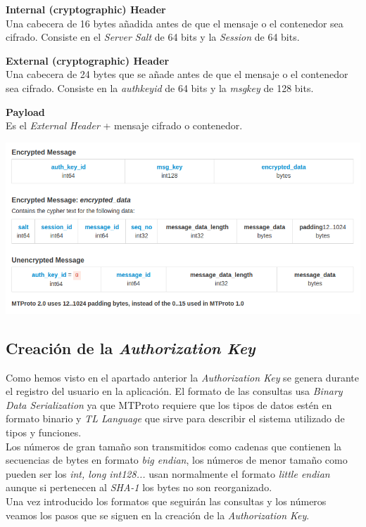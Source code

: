 \begin{description}
	\item \textbf{Internal (cryptographic) Header}\\
	Una cabecera de 16 bytes añadida antes de que el mensaje o el contenedor sea cifrado. Consiste en el \emph{Server Salt} de 64 bits y la \emph{Session} de 64 bits.

	\item \textbf{External (cryptographic) Header}\\
	Una cabecera de 24 bytes que se añade antes de que el mensaje o el contenedor sea cifrado. Consiste en la \emph{auth\textunderscore key\textunderscore id} de 64 bits y la \emph{msg\textunderscore key} de 128 bits.

	\item \textbf{Payload}\\
	Es el \emph{External Header} + mensaje cifrado o contenedor.
\end{description}

\includegraphics[scale=0.5]{imagenes/MTProto2.png} 

\subsection{Creación de la \emph{Authorization Key}}
Como hemos visto en el apartado anterior la \emph{Authorization Key} se genera durante el registro del usuario en la aplicación. El formato de las consultas usa \emph{Binary Data Serialization} ya que MTProto requiere que los tipos de datos estén en formato binario y \emph{TL Language} que sirve para describir el sistema utilizado de tipos y funciones.\\
Los números de gran tamaño son transmitidos como cadenas que contienen la secuencias de bytes en formato \emph{big endian}, los números de menor tamaño como pueden ser los \emph{int, long int128...} usan normalmente el formato \emph{little endian} aunque si pertenecen al \emph{SHA-1} los bytes no son reorganizado.\\
Una vez introducido los formatos que seguirán las consultas y los números veamos los pasos que se siguen en la creación de la \emph{Authorization Key}.

